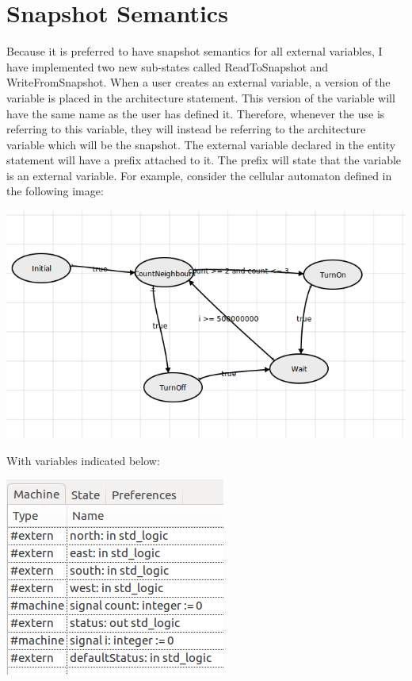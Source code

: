 \documentclass{article}
\begin{document}
	\section{Snapshot Semantics}
		Because it is preferred to have snapshot semantics for all external variables, I have implemented two new sub-states called ReadToSnapshot and WriteFromSnapshot. When a user creates an external variable, a version of the variable is placed in the architecture statement. This version of the variable will have the same name as the user has defined it. Therefore, whenever the use is referring to this variable, they will instead be referring to the architecture variable which will be the snapshot. The external variable declared in the entity statement will have a prefix attached to it. The prefix will state that the variable is an external variable. For example, consider the cellular automaton defined in the following image:
		\begin{center}
			\includegraphics[scale=0.5]{cellularAutomataMachine.png}
		\end{center}
		With variables indicated below:
		\begin{center}
			\includegraphics[scale=1]{CellularAutomataMachineVariables.png}
		\end{center}
\end{document}
